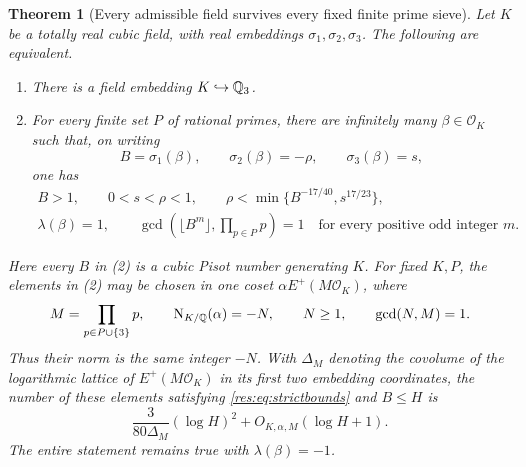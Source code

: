 \documentclass[11pt,a4paper]{article}
\newtheorem{theorem}{Theorem}[section]
\theoremstyle{remark}\newtheorem{remark}[theorem]{Remark}
\begin{document}
\begin{theorem}[Every admissible field survives every fixed finite prime sieve]
\label{res:thm:equivalence}
Let $K$ be a totally real cubic field, with real embeddings
$\sigma_1,\sigma_2,\sigma_3$. The following are equivalent.
\begin{enumerate}
\item There is a field embedding $K\hookrightarrow\mathbb Q_3$.
\item For every finite set $P$ of rational primes, there are infinitely
many $\beta\in\mathcal O_K$ such that, on writing
\[
 B=\sigma_1(\beta),\qquad
 \sigma_2(\beta)=-\rho,\qquad \sigma_3(\beta)=s,
\]
one has
\begin{gather}
 B>1,\qquad 0<s<\rho<1,\qquad
 \rho<\min\{B^{-17/40},s^{17/23}\},
 \label{res:eq:strictbounds}\\
 \lambda(\beta)=1,
 \qquad
 \gcd\left(\lfloor B^m\rfloor,\prod_{p\in P}p\right)=1
 \quad\text{for every positive odd integer }m.
 \label{res:eq:avoid}
\end{gather}
\end{enumerate}
Here every $B$ in (2) is a cubic Pisot number generating $K$.
For fixed $K,P$, the elements in (2) may be chosen in one coset
$\alpha E^+(M\mathcal O_K)$, where
\[
 M=\prod_{p\in P\cup\{3\}}p,
 \qquad \operatorname{N}_{K/\mathbb Q}(\alpha)=-N,
 \qquad N\ge1,
 \qquad \gcd(N,M)=1.
\]
Thus their norm is the same integer $-N$. With
$\Delta_M$ denoting the covolume of the logarithmic lattice of
$E^+(M\mathcal O_K)$ in its first two embedding coordinates, the
number of these elements satisfying \eqref{res:eq:strictbounds} and
$B\le H$ is
\begin{equation}
\label{res:eq:count}
 \frac{3}{80\Delta_M}(\log H)^2
       +O_{K,\alpha,M}(\log H+1).
\end{equation}
The entire statement remains true with $\lambda(\beta)=-1$.
\end{theorem}
\end{document}
